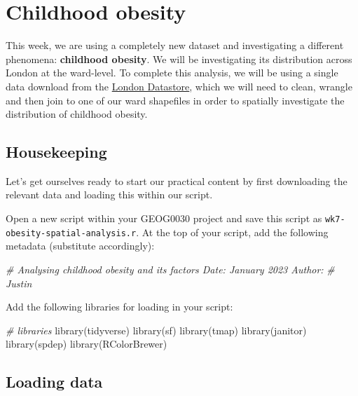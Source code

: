 \documentclass[
]{book}
\newenvironment{Shaded}{\begin{snugshade}}{\end{snugshade}}
\newcommand{\CommentTok}[1]{\textcolor[rgb]{0.56,0.35,0.01}{\textit{#1}}}
\newcommand{\FunctionTok}[1]{\textcolor[rgb]{0.00,0.00,0.00}{#1}}
\newcommand{\NormalTok}[1]{#1}
\begin{document}
\hypertarget{childhood-obesity}{%
\section{Childhood obesity}\label{childhood-obesity}}

This week, we are using a completely new dataset and investigating a different phenomena: \textbf{childhood obesity}. We will be investigating its distribution across London at the ward-level. To complete this analysis, we will be using a single data download from the \href{https://data.london.gov.uk/}{London Datastore}, which we will need to clean, wrangle and then join to one of our ward shapefiles in order to spatially investigate the distribution of childhood obesity.

\hypertarget{housekeeping-w07}{%
\subsection{Housekeeping}\label{housekeeping-w07}}

Let's get ourselves ready to start our practical content by first downloading the relevant data and loading this within our script.

Open a new script within your GEOG0030 project and save this script as \texttt{wk7-obesity-spatial-analysis.r}. At the top of your script, add the following metadata (substitute accordingly):

\begin{Shaded}
\begin{Highlighting}[]
\CommentTok{\# Analysing childhood obesity and its factors Date: January 2023 Author:}
\CommentTok{\# Justin}
\end{Highlighting}
\end{Shaded}

Add the following libraries for loading in your script:

\begin{Shaded}
\begin{Highlighting}[]
\CommentTok{\# libraries}
\FunctionTok{library}\NormalTok{(tidyverse)}
\FunctionTok{library}\NormalTok{(sf)}
\FunctionTok{library}\NormalTok{(tmap)}
\FunctionTok{library}\NormalTok{(janitor)}
\FunctionTok{library}\NormalTok{(spdep)}
\FunctionTok{library}\NormalTok{(RColorBrewer)}
\end{Highlighting}
\end{Shaded}

\hypertarget{loading-data-w07}{%
\subsection{Loading data}\label{loading-data-w07}}
\end{document}
